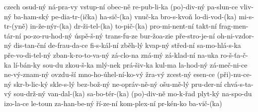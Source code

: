 \begin{hyphenrules}{czech}
{ osud-ný
 ná-pra-vy
 vstup-ní
 obec-ně
 re-pub-li-ka
 (po)-div-ný
 pa-slun-ce
 vliv-ný
 ba-ham-ský
 pe-dia-tr-(ička)
 ha-sič-(ka)
 vnuč-ka
 bro-s-kvoň
 lo-di-vod-(ka)
 mi-s-tr-(yně)
 in-že-nýr-(ka)
 dr-ži-tel-(ka)
 to-pič-(ka)
 pro-mi-nent-ní
 takt-ní
 frag-men-tár-ní
 po-zo-ru-hod-ný
 úspě-š-ný
 trans-fu-ze
 bur-žoa-zie
 pře-stro-je-ní
 oh-ni-vzdor-ný
 dis-tan-ční
 de-frau-da-ce
 fi-s-kál-ní
 zběh-lý
 kvap-ný
 střed-ní
 sa-mo-hlá-s-ka
 pře-vo-di-tel-ný
 zban-k-ro-to-va-ný
 zá-clo-na
 zná-mý
 zá-klad-ní
 na-uka
 ro-š-ťa-č-ka
 lí-bán-ky
 sou-du
 zkou-š-ka
 mlý-nek
 prá-šiv-ka
 kul-ma
 la-hod-ný
 zá-meč-ni-ce
 ne-vý-znam-ný
 ovzdu-ší
 mno-ho-úhel-ní-ko-vý
 žra-vý
 zcest-ný
 esen-ce
 (při)-nu-ce-ný
 skr-b-lic-ký
 skle-s-lý
 bez-bož-ný
 ne-opráv-ně-ný
 ošu-mě-lý
 pru-der-ní
 chvá-s-ta-vý
 sou-drž-ný
 van-dal-(ka)
 sa-bo-tér-(ka)
 (po)-div-ně
 mo-k-řad
 plyt-ký
 na-spo-du
 izo-la-ce
 le-toun
 za-han-be-ný
 ří-ze-ní
 kom-plex-ní
 pr-kén-ko
 ba-vič-(ka)
  }
\end{hyphenrules}
